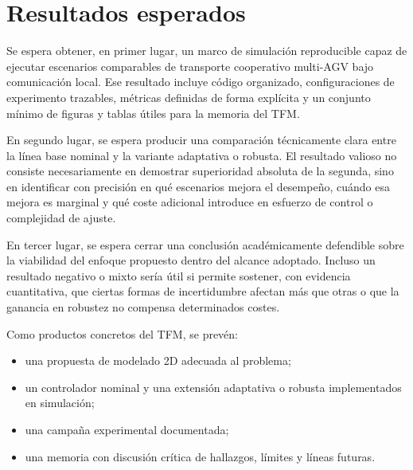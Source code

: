 \section{Resultados esperados}

Se espera obtener, en primer lugar, un marco de simulación reproducible capaz de ejecutar escenarios comparables de transporte cooperativo multi-AGV bajo comunicación local. Ese resultado incluye código organizado, configuraciones de experimento trazables, métricas definidas de forma explícita y un conjunto mínimo de figuras y tablas útiles para la memoria del TFM.

En segundo lugar, se espera producir una comparación técnicamente clara entre la línea base nominal y la variante adaptativa o robusta. El resultado valioso no consiste necesariamente en demostrar superioridad absoluta de la segunda, sino en identificar con precisión en qué escenarios mejora el desempeño, cuándo esa mejora es marginal y qué coste adicional introduce en esfuerzo de control o complejidad de ajuste.

En tercer lugar, se espera cerrar una conclusión académicamente defendible sobre la viabilidad del enfoque propuesto dentro del alcance adoptado. Incluso un resultado negativo o mixto sería útil si permite sostener, con evidencia cuantitativa, que ciertas formas de incertidumbre afectan más que otras o que la ganancia en robustez no compensa determinados costes.

Como productos concretos del TFM, se prevén:
\begin{itemize}
  \item una propuesta de modelado 2D adecuada al problema;
  \item un controlador nominal y una extensión adaptativa o robusta implementados en simulación;
  \item una campaña experimental documentada;
  \item una memoria con discusión crítica de hallazgos, límites y líneas futuras.
\end{itemize}
